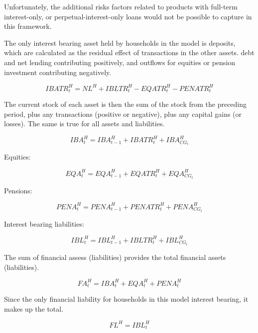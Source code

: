 \documentclass[
]{book}
\begin{document}
Unfortunately, the additional risks factors related to products
with full-term interest-only, or perpetual-interest-only loans would not
be possible to capture in this framework.

The only interest bearing asset held by households in the model is deposits,
which are calculated as the residual effect of transactions in the other assets.
debt and net lending contributing positively, and outflows for equities or pension
investment contributing negatively.

\begin{equation}
IBATR^H_t = NL^H + IBLTR^H_t - EQATR^H_t - PENATR^H_t
\label{eq:ibatr_hh}
\end{equation}

The current stock of each asset is then the sum of the stock from the preceding period,
plus any transactions (positive or negative), plus any capital gains (or losses). The same
is true for all assets and liabilities.

\begin{equation}
IBA^H_t = IBA^H_{t-1} + IBATR^H_t + IBA^H_{CG_t}
\end{equation}

Equities:

\begin{equation}
EQA^H_t = EQA^H_{t-1} + EQATR^H_t + EQA^H_{CG_t}
\end{equation}

Pensions:

\begin{equation}
PENA^H_t = PENA^H_{t-1} + PENATR^H_t + PENA^H_{CG_t}
\end{equation}

Interest bearing liabilities:

\begin{equation}
IBL^H_t = IBL^H_{t-1} + IBLTR^H_t + IBL^H_{CG_t}
\end{equation}

The sum of financial assess (liabilities) provides the total financial assets (liabilities).

\begin{equation}
FA^H_t = IBA^H_t + EQA^H_t + PENA^H_t
\end{equation}

Since the only financial liability for households in this model interest bearing, it makes up the total.

\begin{equation}
FL^H = IBL^H_t
\end{equation}
\end{document}
